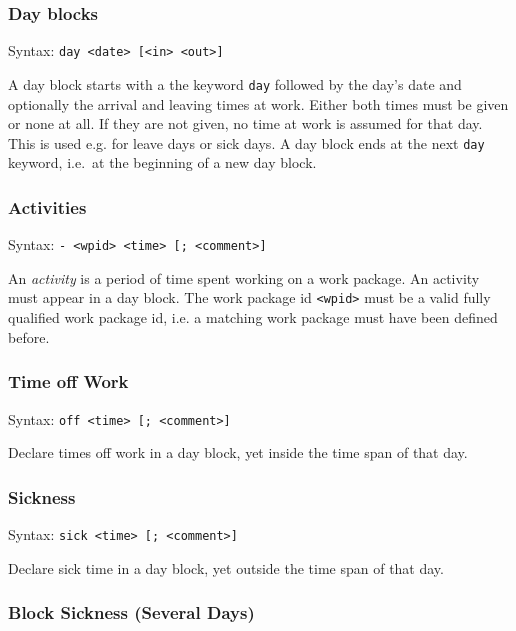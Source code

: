\documentclass[11pt]{article}
\begin{document}
\subsubsection{Day blocks}

Syntax: \verb:day <date> [<in> <out>]:

A day block starts with a the keyword \verb:day: followed by the day's date and optionally the arrival and leaving times at work. Either both times must be given or none at all. If they are not given, no time at work is assumed for that day. This is used e.g. for leave days or sick days. A day block ends at the next \verb:day: keyword, i.e.\ at the beginning of a new day block.


\subsubsection{Activities}

Syntax: \verb:- <wpid> <time> [; <comment>]:

An \emph{activity} is a period of time spent working on a work package. An activity must appear in a day block. The work package id \verb:<wpid>: must be a valid fully qualified work package id, i.e. a matching work package must have been defined before.

\subsubsection{Time off Work}

Syntax: \verb:off <time> [; <comment>]:

Declare times off work in a day block, yet inside the time span of that day.
 
\subsubsection{Sickness}

Syntax: \verb:sick <time> [; <comment>]:

Declare sick time in a day block, yet outside the time span of that day.

\subsubsection{Block Sickness (Several Days)}
\end{document}
